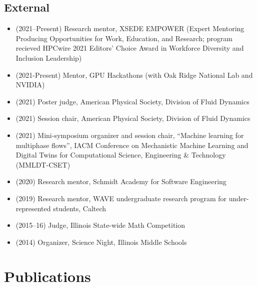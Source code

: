 \subsection{External}
\begin{itemize}
    \item (2021--Present) Research mentor, XSEDE EMPOWER (Expert Mentoring Producing Opportunities for Work, Education, and Research; program recieved HPCwire 2021 Editors' Choice Award in Workforce Diversity and Inclusion Leadership)
    \item (2021-Present) Mentor, GPU Hackathons (with Oak Ridge National Lab and NVIDIA)
    \item (2021) Poster judge, American Physical Society, Division of Fluid Dynamics
    \item (2021) Session chair, American Physical Society, Division of Fluid Dynamics
    \item (2021) Mini-symposium organizer and session chair, ``Machine learning for multiphase flows'', IACM Conference on Mechanistic Machine Learning and Digital Twins for Computational Science, Engineering \& Technology (MMLDT-CSET)
    \item (2020) Research mentor, Schmidt Academy for Software Engineering
    \item (2019) Research mentor, WAVE undergraduate research program for under-represented students, Caltech
    \item (2015--16) Judge, Illinois State-wide Math Competition
    \item (2014) Organizer, Science Night, Illinois Middle Schools
\end{itemize}



\section{Publications}

\nocite{*}

\newrefcontext[labelprefix=P]
\printbibliography[type=unpublished,title={Preprints},resetnumbers=true,heading=subbibnumbered]

\newrefcontext[labelprefix=J]
\printbibliography[type=article,title={Journal papers},resetnumbers=true,heading=subbibnumbered]

\newrefcontext[labelprefix=C]
\printbibliography[type=inproceedings,title={Refereed proceedings},resetnumbers=true,heading=subbibnumbered]

\newrefcontext[labelprefix=O]
\printbibliography[title={Other publications},resetnumbers=true,filter=other,heading=subbibnumbered]

